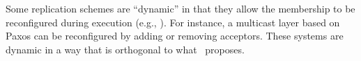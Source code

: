 Some replication schemes are ``dynamic'' in that they allow the membership to be reconfigured during execution (e.g., \cite{birman2010dsr,dustdar2007soc,guessoum2003dar}).
For instance, a multicast layer based on Paxos can be reconfigured by adding or removing acceptors. 
These systems are dynamic in a way that is orthogonal to what \dynastar\ proposes.

